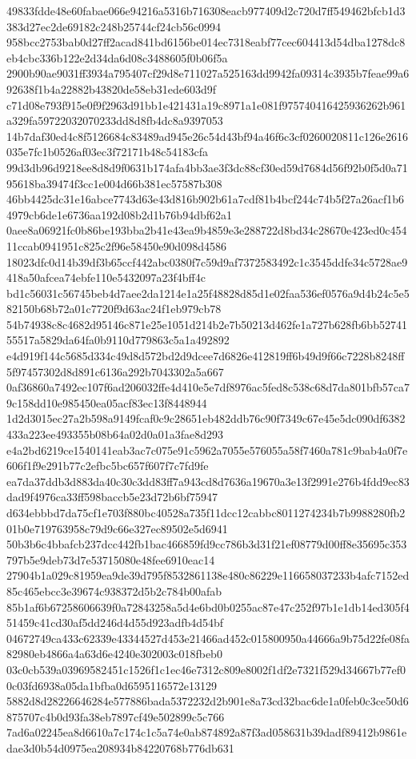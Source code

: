 \documentclass[11pt,a4paper]{article}
\begin{document}
{49833fdde48e60fabae066e94216a5316b716308eacb977409d2c720d7ff549462bfcb1d3383d27ec2de69182c248b25744cf24cb56c0994
958bcc2753bab0d27ff2acad841bd6156be014ec7318eabf77cec604413d54dba1278dc8eb4cbc336b122e2d34da6d08c3488605f0b06f5a
2900b90ae9031ff3934a795407cf29d8e711027a525163dd9942fa09314c3935b7feae99a692638f1b4a22882b43820de58eb31ede603d9f
c71d08e793f915e0f9f2963d91bb1e421431a19c8971a1e081f975740416425936262b961a329fa59722032070233dd8d8fb4dc8a9397053
14b7daf30ed4c8f5126684c83489ad945e26c54d43bf94a46f6c3cf0260020811c126e2616035e7fc1b0526af03ec3f72171b48c54183cfa
99d3db96d9218ee8d8d9f0631b174afa4bb3ae3f3dc88cf30ed59d7684d56f92b0f5d0a7195618ba39474f3cc1e004d66b381ec57587b308
46bb4425dc31e16abce7743d63e43d816b902b61a7cdf81b4bcf244c74b5f27a26acf1b64979cb6de1e6736aa192d08b2d1b76b94dbf62a1
0aee8a06921fc0b86be193bba2b41e43ea9b4859e3e288722d8bd34c28670e423ed0c45411ccab0941951c825c2f96e58450e90d098d4586
18023dfc0d14b39df3b65ccf442abc0380f7c59d9af7372583492c1c3545ddfe34c5728ae9418a50afcea74ebfe110e5432097a23f4bff4c
bd1c56031c56745beb4d7aee2da1214e1a25f48828d85d1e02faa536ef0576a9d4b24c5e582150b68b72a01c7720f9d63ac24f1eb979cb78
54b74938c8c4682d95146c871e25e1051d214b2e7b50213d462fe1a727b628fb6bb5274155517a5829da64fa0b9110d779863c5a1a492892
e4d919f144c5685d334c49d8d572bd2d9dcee7d6826e412819ff6b49d9f66c7228b8248ff5f97457302d8d891c6136a292b7043302a5a667
0af36860a7492ec107f6ad206032ffe4d410e5e7df8976ac5fed8c538c68d7da801bfb57ca79c158dd10e985450ea05acf83ec13f8448944
1d2d3015ec27a2b598a9149fcaf0c9c28651eb482ddb76c90f7349c67e45e5dc090df6382433a223ee493355b08b64a02d0a01a3fae8d293
e4a2bd6219ce1540141eab3ac7c075e91c5962a7055e576055a58f7460a781c9bab4a0f7e606f1f9e291b77c2efbc5bc657f607f7c7fd9fe
ea7da37ddb3d883da40c30c3dd83ff7a943cd8d7636a19670a3e13f2991e276b4fdd9ec83dad9f4976ca33ff598baccb5e23d72b6bf75947
d634ebbbd7da75cf1e703f880bc40528a735f11dcc12cabbc8011274234b7b9988280fb201b0e719763958c79d9c66e327ec89502e5d6941
50b3b6c4bbafcb237dcc442fb1bac466859fd9cc786b3d31f21ef08779d00ff8e35695c353797b5e9deb73d7e53715080e48fee6910eac14
27904b1a029c81959ea9de39d795f8532861138e480c86229e116658037233b4afc7152ed85c465ebcc3e39674c938372d5b2c784b00afab
85b1af6b67258606639f0a72843258a5d4e6bd0b0255ac87e47c252f97b1e1db14ed305f451459c41cd30af5dd246d4d55d923adfb4d54bf
04672749ca433c62339e43344527d453e21466ad452c015800950a44666a9b75d22fe08fa82980eb4866a4a63d6e4240e302003c018fbeb0
03c0cb539a03969582451c1526f1c1ec46e7312c809e8002f1df2e7321f529d34667b77ef00c03fd6938a05da1bfba0d6595116572e13129
5882d8d28226646284e577886bada5372232d2b901e8a73cd32bac6de1a0feb0c3ce50d6875707c4b0d93fa38eb7897cf49e502899c5c766
7ad6a02245ea8d6610a7c174c1c5a74e0ab874892a87f3ad058631b39dadf89412b9861edae3d0b54d0975ea208934b84220768b776db631
}
\end{document}
